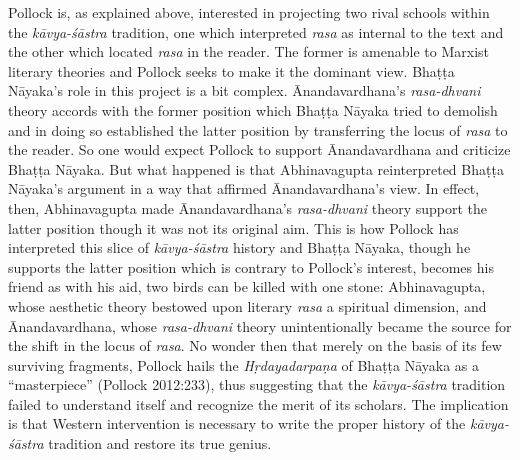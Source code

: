 Pollock is, as explained above, interested in projecting two rival schools within the {\sl kāvya-śāstra} tradition, one which interpreted {\sl rasa} as internal to the text and the other which located {\sl rasa} in the reader. The former is amenable to Marxist literary theories and Pollock seeks to make it the dominant view. Bhaṭṭa Nāyaka's role in this project is a bit complex. Ānandavardhana's {\sl rasa-dhvani} theory accords with the former position which Bhaṭṭa Nāyaka tried to demolish and in doing so established the latter position by transferring the locus of {\sl rasa} to the reader. So one would expect Pollock to support Ānandavardhana and criticize Bhaṭṭa Nāyaka. But what happened is that Abhinavagupta reinterpreted Bhaṭṭa Nāyaka's argument in a way that affirmed Ānandavardhana's view. In effect, then, Abhinavagupta made Ānandavardhana's {\sl rasa-dhvani} theory support the latter position though it was not its original aim. This is how Pollock has interpreted this slice of {\sl kāvya-śāstra} history and Bhaṭṭa Nāyaka, though he supports the latter position which is contrary to Pollock's interest, becomes his friend as with his aid, two birds can be killed with one stone: Abhinavagupta, whose aesthetic theory bestowed upon literary {\sl rasa} a spiritual dimension, and Ānandavardhana, whose {\sl rasa-dhvani} theory unintentionally became the source for the shift in the locus of {\sl rasa}. No wonder then that merely on the basis of its few surviving fragments, Pollock hails the {\sl Hṛdayadarpaṇa} of Bhaṭṭa Nāyaka as a ``masterpiece'' (Pollock 2012:233), thus suggesting that the {\sl kāvya-śāstra} tradition failed to understand itself and recognize the merit of its scholars. The implication is that Western intervention is necessary to write the proper history of the {\sl kāvya-śāstra} tradition and restore its true genius.

